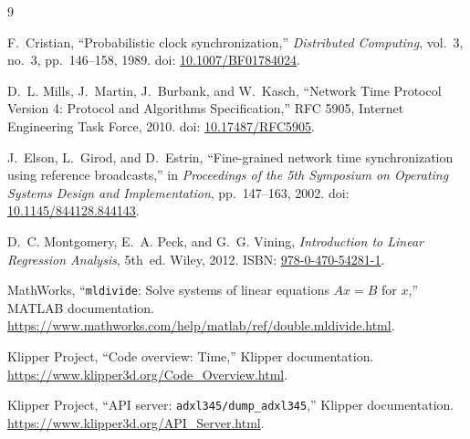 \documentclass[11pt,a4paper]{article}
\begin{document}
\begin{thebibliography}{9}

F.~Cristian,
\newblock ``Probabilistic clock synchronization,''
\newblock \emph{Distributed Computing}, vol.~3, no.~3, pp.~146--158, 1989.
\newblock doi: \href{https://doi.org/10.1007/BF01784024}{10.1007/BF01784024}.

D.~L. Mills, J.~Martin, J.~Burbank, and W.~Kasch,
\newblock ``Network Time Protocol Version 4: Protocol and Algorithms Specification,''
\newblock RFC 5905, Internet Engineering Task Force, 2010.
\newblock doi: \href{https://doi.org/10.17487/RFC5905}{10.17487/RFC5905}.

J.~Elson, L.~Girod, and D.~Estrin,
\newblock ``Fine-grained network time synchronization using reference broadcasts,''
\newblock in \emph{Proceedings of the 5th Symposium on Operating Systems Design
and Implementation}, pp.~147--163, 2002.
\newblock doi: \href{https://doi.org/10.1145/844128.844143}{10.1145/844128.844143}.

D.~C. Montgomery, E.~A. Peck, and G.~G. Vining,
\newblock \emph{Introduction to Linear Regression Analysis},
\newblock 5th~ed. Wiley, 2012.
\newblock ISBN: \href{https://catalogimages.wiley.com/images/db/pdf/9780470542811.excerpt.pdf}{978-0-470-54281-1}.

MathWorks,
\newblock ``\texttt{mldivide}: Solve systems of linear equations
\(A x = B\) for \(x\),'' MATLAB documentation.
\newblock \url{https://www.mathworks.com/help/matlab/ref/double.mldivide.html}.

Klipper Project,
\newblock ``Code overview: Time,'' Klipper documentation.
\newblock \url{https://www.klipper3d.org/Code_Overview.html}.

Klipper Project,
\newblock ``API server: \texttt{adxl345/dump\_adxl345},'' Klipper documentation.
\newblock \url{https://www.klipper3d.org/API_Server.html}.

\end{thebibliography}
\end{document}
